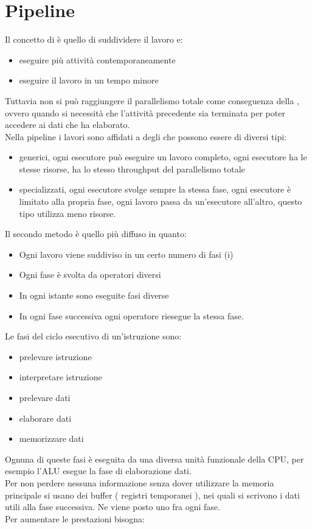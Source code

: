 \documentclass[arch.tex]{subfiles}
\begin{document}
\section{Pipeline}%
\label{sec:pipeline}
Il concetto di  è quello di suddividere il lavoro e:

\begin{itemize}
	\item eseguire più attività contemporaneamente
	\item eseguire il lavoro in un tempo minore
\end{itemize}
Tuttavia non si può raggiungere il parallelismo totale come conseguenza della , ovvero quando si necessità che l'attività precedente sia
terminata per poter accedere ai dati che ha elaborato.\\
Nella pipeline i lavori sono affidati a degli  che possono essere
di diversi tipi:

\begin{itemize}
	\item generici, ogni esecutore può eseguire un lavoro completo,
		ogni esecutore ha le stesse risorse, ha lo stesso throughput del
		parallelismo totale
	\item specializzati, ogni esecutore svolge sempre la stessa fase,
		ogni esecutore è limitato alla propria fase, ogni lavoro passa 
		da un'esecutore all'altro, questo tipo utilizza meno risorse.
\end{itemize}
Il secondo metodo è quello più diffuso in quanto:

\begin{itemize}
	\item Ogni lavoro viene suddiviso in un certo numero di fasi (i)
	\item Ogni fase è svolta da operatori diversi
	\item In ogni istante sono eseguite fasi diverse
	\item In ogni fase successiva ogni operatore riesegue la stessa fase.
\end{itemize}
Le fasi del ciclo esecutivo di un'istruzione sono:

\begin{itemize}
	\item prelevare istruzione
	\item interpretare istruzione
	\item prelevare dati
	\item elaborare dati
	\item memorizzare dati
\end{itemize}
Ognuna di queste fasi è eseguita da una diversa unità funzionale della CPU,
per esempio l'ALU esegue la fase di elaborazione dati.\\
Per non perdere nessuna informazione senza dover utilizzare la memoria 
principale si usano dei buffer ( registri temporanei ), nei quali si scrivono 
i dati utili alla fase successiva. Ne viene posto uno fra ogni fase.\\
Per aumentare le prestazioni bisogna:
\end{document}
